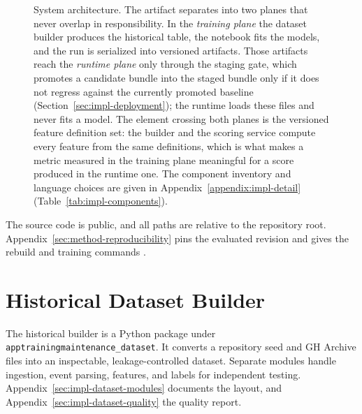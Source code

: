 \begin{figure}[htbp]
\caption[System architecture of OSS Risk Radar]{System architecture. The artifact
separates into two planes that never overlap in responsibility. In the
\emph{training plane} the dataset builder produces the historical table, the
notebook fits the models, and the run is serialized into versioned artifacts. Those
artifacts reach the \emph{runtime plane} only through the staging gate, which
promotes a candidate bundle into the staged bundle only if it does not regress
against the currently promoted baseline (Section~\ref{sec:impl-deployment}); the
runtime loads these files and never fits a model. The element crossing both planes
is the versioned feature definition set: the builder and the scoring service
compute every feature from the same definitions, which is what makes a metric
measured in the training plane meaningful for a score produced in the runtime one.
The component inventory and language choices are given in
Appendix~\ref{appendix:impl-detail} (Table~\ref{tab:impl-components}).}
\label{fig:architecture}
\end{figure}

The source code is public, and all paths are relative to the repository root.
Appendix~\ref{sec:method-reproducibility} pins the evaluated revision and gives
the rebuild and training commands \cite{ossRiskRadarReadme}.

\section{Historical Dataset Builder}
\label{sec:impl-dataset-builder}

The historical builder is a Python package under
\texttt{app\sslash training\sslash maintenance\_dataset}. It converts a
repository seed and GH Archive files into an inspectable, leakage-controlled
dataset. Separate modules handle ingestion, event parsing, features, and labels
for independent testing. Appendix~\ref{sec:impl-dataset-modules} documents the
layout, and Appendix~\ref{sec:impl-dataset-quality} the quality report.

